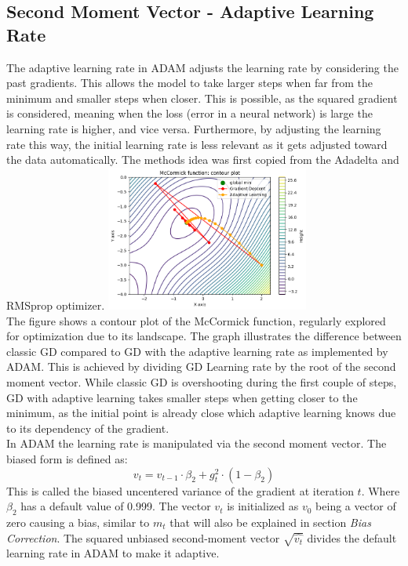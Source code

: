 \documentclass[journal]{IEEEtran}
\begin{document}
\subsection{Second Moment Vector - Adaptive Learning Rate}
The adaptive learning rate in ADAM adjusts the learning rate by considering the past gradients. This allows the model to take larger steps when far from the minimum and smaller steps when closer. This is possible, as the squared gradient is considered, meaning when the loss (error in a neural network) is large the learning rate is higher, and vice versa. Furthermore, by adjusting the learning rate this way, the initial learning rate is less relevant as it gets adjusted toward the data automatically. The methods idea was first copied from the Adadelta and RMSprop optimizer.
\includegraphics[width=0.5\textwidth]{report/figures/GD_rmsprop.png}\\
The figure shows a contour plot of the McCormick function, regularly explored for optimization due to its landscape. The graph illustrates the difference between classic GD compared to GD with the adaptive learning rate as implemented by ADAM. This is achieved by dividing GD Learning rate by the root of the second moment vector. While classic GD is overshooting during the first couple of steps, GD with adaptive learning takes smaller steps when getting closer to the minimum, as the initial point is already close which adaptive learning knows due to its dependency of the gradient.\\
In ADAM the learning rate is manipulated via the second moment vector. The biased form is defined as:
$$v_t = v_{t-1} \cdot \beta_2 + g_t^2 \cdot (1-\beta_2)$$
This is called the biased uncentered variance of the gradient at iteration $t$. Where $\beta_2$ has a default value of 0.999. The vector $v_t$ is initialized as $v_0$ being a vector of zero causing a bias, similar to $m_t$ that will also be explained in section \textit{Bias Correction}. The squared unbiased second-moment vector $\sqrt{\hat{v_t}}$ divides the default learning rate in ADAM to make it adaptive.\\
\end{document}
